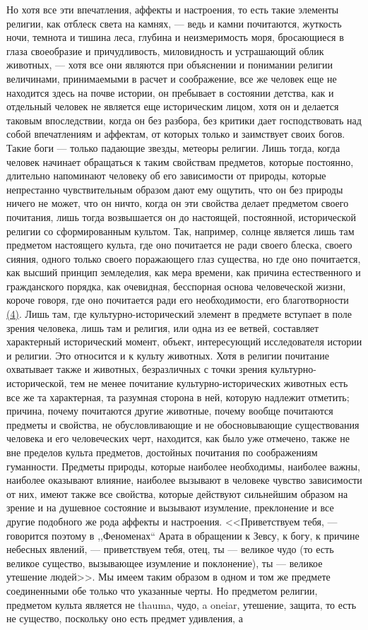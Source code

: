 \documentclass[12pt]{article}
\begin{document}
Но хотя все эти впечатления, аффекты и настроения, то есть такие элементы религии, как отблеск света на камнях, --- ведь и камни почитаются, жуткость ночи, темнота и тишина леса, глубина и неизмеримость моря, бросающиеся в глаза своеобразие и причудливость, миловидность и устрашающий облик животных, --- хотя все они являются при объяснении и понимании религии величинами, принимаемыми в расчет и соображение, все же человек еще не находится здесь на почве истории, он пребывает в состоянии детства, как и отдельный человек не является еще историческим лицом, хотя он и делается таковым впоследствии, когда он без разбора, без критики дает господствовать над собой впечатлениям и аффектам, от которых только и заимствует своих богов. Такие боги --- только падающие звезды, метеоры религии. Лишь тогда, когда человек начинает обращаться к таким свойствам предметов, которые постоянно, длительно напоминают человеку об его зависимости от природы, которые непрестанно чувствительным образом дают ему ощутить, что он без природы ничего не может, что он ничто, когда он эти свойства делает предметом своего почитания, лишь тогда возвышается он до настоящей, постоянной, исторической религии со сформированным культом. Так, например, солнце является лишь там предметом настоящего культа, где оно почитается не ради своего блеска, своего сияния, одного только своего поражающего глаз существа, но где оно почитается, как высший принцип земледелия, как мера времени, как причина естественного и гражданского порядка, как очевидная, бесспорная основа человеческой жизни, короче говоря, где оно почитается ради его необходимости, его благотворности \hyperlink{4}{(4)}\hypertarget{b4}{}. Лишь там, где культурно-исторический элемент в предмете вступает в поле зрения человека, лишь там и религия, или одна из ее ветвей, составляет характерный исторический момент, объект, интересующий исследователя истории и религии. Это относится и к культу животных. Хотя в религии почитание охватывает также и животных, безразличных с точки зрения культурно-исторической, тем не менее почитание культурно-исторических животных есть все же та характерная, та разумная сторона в ней, которую надлежит отметить; причина, почему почитаются другие животные, почему вообще почитаются предметы и свойства, не обусловливающие и не обосновывающие существования человека и его человеческих черт, находится, как было уже отмечено, также не вне пределов культа предметов, достойных почитания по соображениям гуманности. Предметы природы, которые наиболее необходимы, наиболее важны, наиболее оказывают влияние, наиболее вызывают в человеке чувство зависимости от них, имеют также все свойства, которые действуют сильнейшим образом на зрение и на душевное состояние и вызывают изумление, преклонение и все другие подобного же рода аффекты и настроения. <<Приветствуем тебя, --- говорится поэтому в ,,Феноменах`` Арата в обращении к Зевсу, к богу, к причине небесных явлений, --- приветствуем тебя, отец, ты --- великое чудо (то есть великое существо, вызывающее изумление и поклонение), ты --- великое утешение людей>>. Мы имеем таким образом в одном и том же предмете соединенными обе только что указанные черты. Но предметом религии, предметом культа является не thauma, чудо, a oneiar, утешение, защита, то есть не существо, поскольку оно есть предмет удивления, а 
\end{document}
